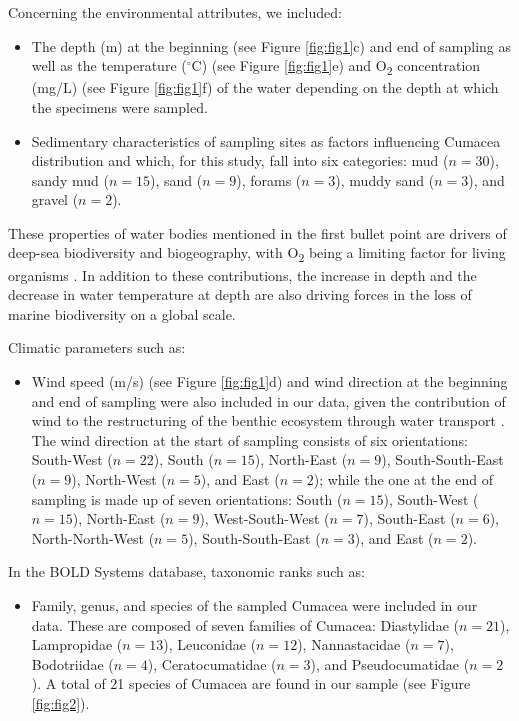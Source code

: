 Concerning the environmental attributes, we included:
\begin{itemize}
\item The depth (m) at the beginning (see Figure \ref{fig:fig1}c) and end of sampling as well as the temperature ($^\circ$C) (see Figure \ref{fig:fig1}e) and O\textsubscript{2} concentration (mg/L) (see Figure \ref{fig:fig1}f) of the water depending on the depth at which the specimens were sampled. 
\item Sedimentary characteristics of sampling sites as factors influencing Cumacea distribution \citep{uhlir_adding_2021} and which, for this study, fall into six categories: mud ($n=30$), sandy mud ($n=15$), sand ($n=9$), forams ($n=3$), muddy sand ($n=3$), and gravel ($n=2$).
\end{itemize}

These properties of water bodies mentioned in the first bullet point are drivers of deep-sea biodiversity and biogeography, with O\textsubscript{2} being a limiting factor for living organisms \citep{keeling_ocean_2010}. In addition to these contributions, the increase in depth \citep{rex_global_2006,costello_marine_2017} and the decrease in water temperature at depth \citep{lambshead_latitudinal_2000} are also driving forces in the loss of marine biodiversity on a global scale.

Climatic parameters such as: 
\begin{itemize}
\item Wind speed (m/s) (see Figure \ref{fig:fig1}d) and wind direction at the beginning and end of sampling were also included in our data, given the contribution of wind to the restructuring of the benthic ecosystem through water transport \citep{waga_recent_2020,saeedi_environmental_2022}. 
The wind direction at the start of sampling consists of six orientations: South-West ($n=22$), South ($n=15$), North-East ($n=9$), South-South-East ($n=9$), North-West ($n=5$), and East ($n=2$); while the one at the end of sampling is made up of seven orientations: South ($n=15$), South-West ($n=15$), North-East ($n=9$), West-South-West ($n=7$), South-East ($n=6$), North-North-West ($n=5$), South-South-East ($n=3$), and East ($n=2$). 
\end{itemize}

In the BOLD Systems database, taxonomic ranks such as: 
\begin{itemize}
\item Family, genus, and species of the sampled Cumacea were included in our data. These are composed of seven families of Cumacea: Diastylidae ($n=21$), Lampropidae ($n=13$), Leuconidae ($n=12$), Nannastacidae ($n=7$), Bodotriidae ($n=4$), Ceratocumatidae ($n=3$), and Pseudocumatidae ($n=2$). A total of 21 species of Cumacea are found in our sample (see Figure \ref{fig:fig2}).
\end{itemize}

